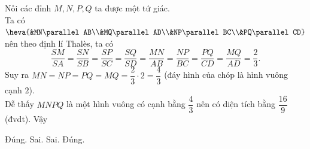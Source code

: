 \begin{ex}
{			Nối các đỉnh $M,N,P,Q$ ta được một tứ giác.\\
			Ta có $\heva{&MN\parallel AB\\&MQ\parallel AD\\&NP\parallel BC\\&PQ\parallel CD}$ nên theo định lí Thalès, ta có
			\[\dfrac{SM}{SA}=\dfrac{SN}{SB}=\dfrac{SP}{SC}=\dfrac{SQ}{SD}=\dfrac{MN}{AB}=\dfrac{NP}{BC}=\dfrac{PQ}{CD}=\dfrac{MQ}{AD}=\dfrac{2}{3}.\]
			Suy ra $MN=NP=PQ=MQ=\dfrac{2}{3} \cdot 2=\dfrac{4}{3}$ (đáy hình của chóp là hình vuông cạnh $2$).\\
			Dễ thấy $MNPQ$ là một hình vuông có cạnh bằng $\dfrac{4}{3}$ nên có diện tích bằng $\dfrac{16}{9}$ (đvdt). Vậy
			\begin{itemchoice}
				\itemch Đúng. 
				\itemch Sai.
				\itemch Sai. 
				\itemch Đúng. 
			\end{itemchoice}		
		}
	\end{ex}
	

